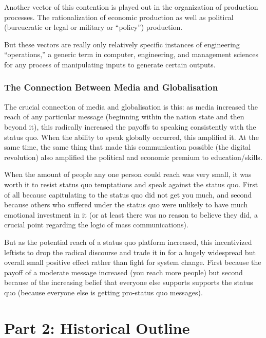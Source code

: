 \documentclass[12pt,book]{article}
\begin{document}
Another vector of this contention is played out in the organization of
production processes. The rationalization of economic production as well
as political (bureucratic or legal or military or ``policy'')
production.

But these vectors are really only relatively specific instances of
engineering ``operations,'' a generic term in computer, engineering, and
management sciences for any process of manipulating inputs to generate
certain outputs.

\subsubsection{The Connection Between Media and
Globalisation}\label{the-connection-between-media-and-globalisation}

The crucial connection of media and globalisation is this: as media
increased the reach of any particular message (beginning within the
nation state and then beyond it), this radically increased the payoffs
to speaking consistently with the status quo. When the ability to speak
globally occurred, this amplified it. At the same time, the same thing
that made this communication possible (the digital revolution) also
amplified the political and economic premium to education/skills.

When the amount of people any one person could reach was very small, it
was worth it to resist status quo temptations and speak against the
status quo. First of all because capitulating to the status quo did not
get you much, and second because others who suffered under the status
quo were unlikely to have much emotional investment in it (or at least
there was no reason to believe they did, a crucial point regarding the
logic of mass communications).

But as the potential reach of a status quo platform increased, this
incentivized leftists to drop the radical discourse and trade it in for
a hugely widespread but overall small positive effect rather than fight
for system change. First because the payoff of a moderate message
increased (you reach more people) but second because of the increasing
belief that everyone else supports supports the status quo (because
everyone else is getting pro-status quo messages).

\section{Part 2: Historical Outline}\label{part-2-historical-outline}
\end{document}
